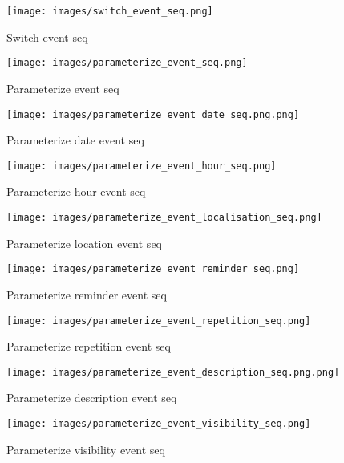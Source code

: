 \documentclass{article}
\begin{document}
\begin{figure}[H]
    \centering
    \texttt{[image: images/switch\_event\_seq.png]}
    \caption{Switch event seq}
    \label{fig:9}
\end{figure}

\begin{figure}[H]
    \centering
    \texttt{[image: images/parameterize\_event\_seq.png]}
    \caption{Parameterize event seq}
    \label{fig:10}
\end{figure}

\begin{figure}[H]
    \centering
    \texttt{[image: images/parameterize\_event\_date\_seq.png.png]}
    \caption{Parameterize date event seq}
    \label{fig:11}
\end{figure}

\begin{figure}[H]
    \centering
    \texttt{[image: images/parameterize\_event\_hour\_seq.png]}
    \caption{Parameterize hour event seq}
    \label{fig:12}
\end{figure}

\begin{figure}[H]
    \centering
    \texttt{[image: images/parameterize\_event\_localisation\_seq.png]}
    \caption{Parameterize location event seq}
    \label{fig:13}
\end{figure}

\begin{figure}[H]
    \centering
    \texttt{[image: images/parameterize\_event\_reminder\_seq.png]}
    \caption{Parameterize reminder event seq}
    \label{fig:14}
\end{figure}

\begin{figure}[H]
    \centering
    \texttt{[image: images/parameterize\_event\_repetition\_seq.png]}
    \caption{Parameterize repetition event seq}
    \label{fig:15}
\end{figure}

\begin{figure}[H]
    \centering
    \texttt{[image: images/parameterize\_event\_description\_seq.png.png]}
    \caption{Parameterize description event seq}
    \label{fig:16}
\end{figure}

\begin{figure}[H]
    \centering
    \texttt{[image: images/parameterize\_event\_visibility\_seq.png]}
    \caption{Parameterize visibility event seq}
    \label{fig:17}
\end{figure}
\end{document}
